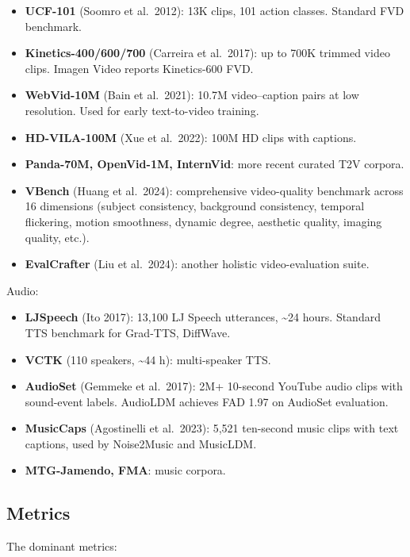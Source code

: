 \documentclass{article}
\begin{document}
\begin{itemize}

\item
  \textbf{UCF-101} (Soomro et al.~2012): 13K clips, 101 action classes. Standard FVD benchmark.
\item
  \textbf{Kinetics-400/600/700} (Carreira et al.~2017): up to 700K trimmed video clips. Imagen Video reports Kinetics-600 FVD.
\item
  \textbf{WebVid-10M} (Bain et al.~2021): 10.7M video--caption pairs at low resolution. Used for early text-to-video training.
\item
  \textbf{HD-VILA-100M} (Xue et al.~2022): 100M HD clips with captions.
\item
  \textbf{Panda-70M, OpenVid-1M, InternVid}: more recent curated T2V corpora.
\item
  \textbf{VBench} (Huang et al.~2024): comprehensive video-quality benchmark across 16 dimensions (subject consistency, background consistency, temporal flickering, motion smoothness, dynamic degree, aesthetic quality, imaging quality, etc.).
\item
  \textbf{EvalCrafter} (Liu et al.~2024): another holistic video-evaluation suite.
\end{itemize}

Audio:

\begin{itemize}

\item
  \textbf{LJSpeech} (Ito 2017): 13,100 LJ Speech utterances, \textasciitilde24 hours. Standard TTS benchmark for Grad-TTS, DiffWave.
\item
  \textbf{VCTK} (110 speakers, \textasciitilde44 h): multi-speaker TTS.
\item
  \textbf{AudioSet} (Gemmeke et al.~2017): 2M+ 10-second YouTube audio clips with sound-event labels. AudioLDM achieves FAD 1.97 on AudioSet evaluation.
\item
  \textbf{MusicCaps} (Agostinelli et al.~2023): 5,521 ten-second music clips with text captions, used by Noise2Music and MusicLDM.
\item
  \textbf{MTG-Jamendo, FMA}: music corpora.
\end{itemize}

\subsection{Metrics}\label{metrics}

The dominant metrics:
\end{document}
